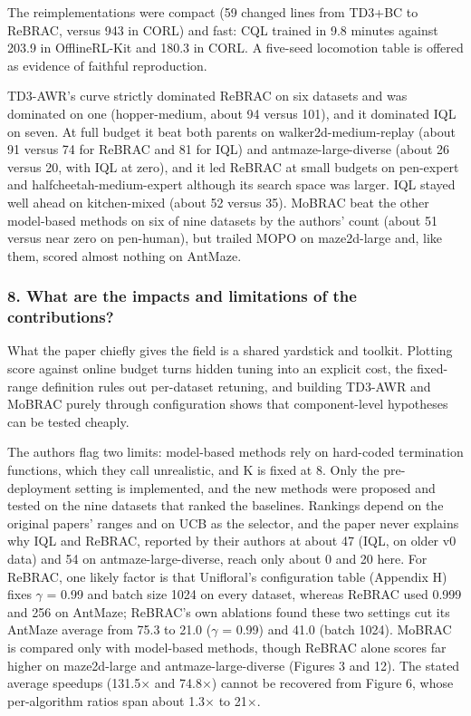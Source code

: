 \documentclass[11pt]{article}
\newcommand{\question}[1]{\subsubsection*{#1}}
\begin{document}
The reimplementations were compact (59 changed lines from TD3+BC to ReBRAC, versus 943 in CORL) and fast: CQL trained in 9.8 minutes against 203.9 in OfflineRL-Kit and 180.3 in CORL. A five-seed locomotion table is offered as evidence of faithful reproduction.

TD3-AWR's curve strictly dominated ReBRAC on six datasets and was dominated on one (hopper-medium, about 94 versus 101), and it dominated IQL on seven. At full budget it beat both parents on walker2d-medium-replay (about 91 versus 74 for ReBRAC and 81 for IQL) and antmaze-large-diverse (about 26 versus 20, with IQL at zero), and it led ReBRAC at small budgets on pen-expert and halfcheetah-medium-expert although its search space was larger. IQL stayed well ahead on kitchen-mixed (about 52 versus 35). MoBRAC beat the other model-based methods on six of nine datasets by the authors' count (about 51 versus near zero on pen-human), but trailed MOPO on maze2d-large and, like them, scored almost nothing on AntMaze.

\question{8. What are the impacts and limitations of the contributions?}

What the paper chiefly gives the field is a shared yardstick and toolkit. Plotting score against online budget turns hidden tuning into an explicit cost, the fixed-range definition rules out per-dataset retuning, and building TD3-AWR and MoBRAC purely through configuration shows that component-level hypotheses can be tested cheaply.

The authors flag two limits: model-based methods rely on hard-coded termination functions, which they call unrealistic, and K is fixed at 8. Only the pre-deployment setting is implemented, and the new methods were proposed and tested on the nine datasets that ranked the baselines. Rankings depend on the original papers' ranges and on UCB as the selector, and the paper never explains why IQL and ReBRAC, reported by their authors at about 47 (IQL, on older v0 data) and 54 on antmaze-large-diverse, reach only about 0 and 20 here. For ReBRAC, one likely factor is that Unifloral's configuration table (Appendix H) fixes \ensuremath{\gamma} = 0.99 and batch size 1024 on every dataset, whereas ReBRAC used 0.999 and 256 on AntMaze; ReBRAC's own ablations found these two settings cut its AntMaze average from 75.3 to 21.0 (\ensuremath{\gamma} = 0.99) and 41.0 (batch 1024). MoBRAC is compared only with model-based methods, though ReBRAC alone scores far higher on maze2d-large and antmaze-large-diverse (Figures 3 and 12). The stated average speedups (131.5\ensuremath{\times} and 74.8\ensuremath{\times}) cannot be recovered from Figure 6, whose per-algorithm ratios span about 1.3\ensuremath{\times} to 21\ensuremath{\times}.
\end{document}
